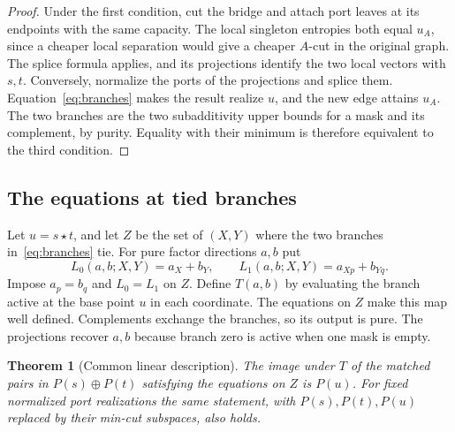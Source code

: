 \documentclass[11pt]{article}
\newtheorem{theorem}{Theorem}[section]
\begin{document}
\begin{proof}
Under the first condition, cut the bridge and attach port leaves at
its endpoints with the same capacity. The local singleton entropies
both equal \(u_A\), since a cheaper local separation would give a
cheaper \(A\)-cut in the original graph. The splice formula applies, and
its projections identify the two local vectors with \(s,t\).
Conversely, normalize the ports of the projections and splice them.
Equation~\eqref{eq:branches} makes the result realize \(u\), and the new
edge attains \(u_A\). The two branches are the two subadditivity upper
bounds for a mask and its complement, by purity. Equality with their
minimum is therefore equivalent to the third condition.
\end{proof}

\subsection{The equations at tied branches}

Let \(u=s\star t\), and let \(Z\) be the set of \((X,Y)\) where the two
branches in~\eqref{eq:branches} tie. For pure factor directions \(a,b\)
put
\[
 L_0(a,b;X,Y)=a_X+b_Y,\qquad
 L_1(a,b;X,Y)=a_{Xp}+b_{Yq}.
\]
Impose \(a_p=b_q\) and \(L_0=L_1\) on \(Z\). Define \(T(a,b)\) by
evaluating the branch active at the base point \(u\) in each coordinate.
The equations on \(Z\) make this map well defined. Complements exchange
the branches, so its output is pure. The projections recover \(a,b\)
because branch zero is active when one mask is empty.

\begin{theorem}[Common linear description]
\label{thm:linear}
The image under \(T\) of the matched pairs in \(P(s)\oplus P(t)\)
satisfying the equations on \(Z\) is \(P(u)\). For fixed normalized
port realizations the same statement, with \(P(s),P(t),P(u)\) replaced
by their min-cut subspaces, also holds.
\end{theorem}
\end{document}

